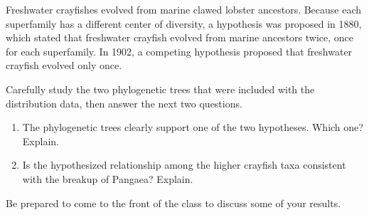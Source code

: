 \documentclass[11pt]{article}
\begin{document}
\newpage

Freshwater crayfishes evolved from marine clawed lobster ancestors.
Because each superfamily has a different center of diversity, a
hypothesis was proposed in 1880, which stated that freshwater crayfish 
evolved from marine ancestors twice, once for each superfamily. In 1902,
a competing hypothesis proposed that freshwater crayfish evolved only
once.

Carefully study the two phylogenetic trees that were included with the
distribution data, then answer the next two questions.

\begin{enumerate}[resume, leftmargin=*]
\item The phylogenetic trees clearly support one of the two hypotheses.
Which one? Explain.

\item Is the hypothesized relationship among the higher crayfish taxa
consistent with the breakup of Pangaea? Explain.

\end{enumerate}

Be prepared to come to the front of the class to discuss some of your
results.
\end{document}
